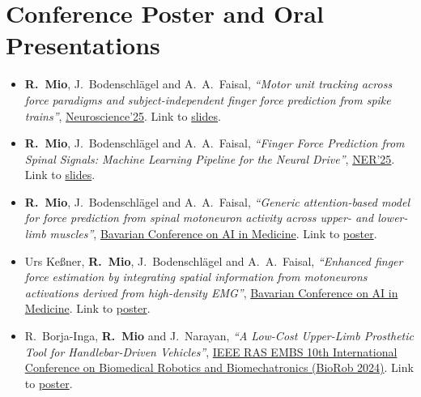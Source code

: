 \documentclass[a4paper,10pt]{article}
\begin{document}
\section{Conference Poster and Oral Presentations}

\begin{itemize}
  \item \textbf{R.\ Mio}, J.\ Bodenschl\"agel and A.\ A.\ Faisal,
        \textit{``Motor unit tracking across force paradigms and subject-independent finger force
        prediction from spike trains''},
        \href{https://cmsfiles.s3.amazonaws.com/ner2025/proceedings/61569_CFP25CNE-ART/pdfs/0001194.pdf}{Neuroscience'25}.
        Link to \href{https://drive.google.com/file/d/13unzQtqwPZ9eM1asmOXzJiohuUaCmKiP/view}{slides}.

  \item \textbf{R.\ Mio}, J.\ Bodenschl\"agel and A.\ A.\ Faisal,
        \textit{``Finger Force Prediction from Spinal Signals: Machine Learning Pipeline for the
        Neural Drive''},
        \href{https://cmsfiles.s3.amazonaws.com/ner2025/proceedings/61569_CFP25CNE-ART/pdfs/0001194.pdf}{NER'25}.
        Link to \href{https://drive.google.com/file/d/1tA1x0ZtYpeS_oH596BxBRVkEx5lqLxT4/view}{slides}.

  \item \textbf{R.\ Mio}, J.\ Bodenschl\"agel and A.\ A.\ Faisal,
        \textit{``Generic attention-based model for force prediction from spinal motoneuron
        activity across upper- and lower-limb muscles''},
        \href{https://events.hifis.net/event/2048/overview}{Bavarian Conference on AI in Medicine}.
        Link to \href{https://drive.google.com/file/d/1Bf5zGzO_efQ2zlAygwavf4fBbF0I2lSK/view}{poster}.

  \item Urs Ke\ss ner, \textbf{R.\ Mio}, J.\ Bodenschl\"agel and A.\ A.\ Faisal,
        \textit{``Enhanced finger force estimation by integrating spatial information from
        motoneurons activations derived from high-density EMG''},
        \href{https://events.hifis.net/event/2048/overview}{Bavarian Conference on AI in Medicine}.
        Link to \href{https://drive.google.com/file/d/1DoIFTXmPk0SWMkDUIpufXHAe1I7s-B4X/view}{poster}.

  \item R.\ Borja-Inga, \textbf{R.\ Mio} and J.\ Narayan,
        \textit{``A Low-Cost Upper-Limb Prosthetic Tool for Handlebar-Driven Vehicles''},
        \href{https://www.biorob2024.org/}{IEEE RAS EMBS 10th International Conference on
        Biomedical Robotics and Biomechatronics (BioRob 2024)}.
        Link to \href{https://drive.google.com/file/d/1gZYVSDfa1JtAwqObbTi2WXZDAx2tNI-v/view}{poster}.


\end{itemize}
\end{document}
